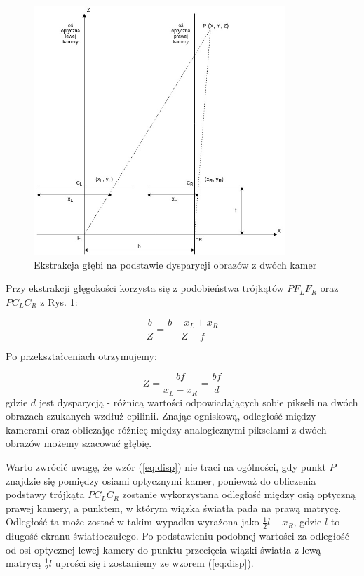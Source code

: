 \documentclass[oneside, eng]{mgr}
\begin{document}
\begin{figure}
	\centering
	\includegraphics[width=9.5cm]{ekstrakcja.jpg}
	\caption{Ekstrakcja głębi na podstawie dysparycji obrazów z dwóch kamer}
	\label{fig:extraction}
\end{figure}

Przy ekstrakcji głęgokości korzysta się z podobieństwa trójkątów $P F_L F_R$ oraz $P C_L C_R$ z Rys. \ref{fig:extraction}:

\begin{equation}
	\frac{b}{Z} = \frac{b-x_L+x_R}{Z-f}
	\label{eq:disp}
\end{equation}

Po przekształceniach otrzymujemy:

\begin{equation}
	Z = \frac{bf}{x_L-x_R} = \frac{bf}{d}
\end{equation}
gdzie $d$ jest dysparycją - różnicą wartości odpowiadających sobie pikseli na dwóch obrazach szukanych wzdłuż epilinii.
Znając ogniskową, odległość między kamerami oraz obliczając różnicę między analogicznymi pikselami z dwóch obrazów możemy szacować głębię.

Warto zwrócić uwagę, że wzór (\ref{eq:disp}) nie traci na ogólności, gdy punkt $P$ znajdzie się pomiędzy osiami optycznymi kamer, ponieważ do obliczenia podstawy trójkąta $P C_L C_R$ zostanie wykorzystana odległość między osią optyczną prawej kamery, a punktem, w którym wiązka światła pada na prawą matrycę. Odległość ta może zostać w takim wypadku wyrażona jako $\frac{1}{2}l-x_R$, gdzie $l$ to długość ekranu światłoczułego. Po podstawieniu podobnej wartości za odległość od osi optycznej lewej kamery do punktu przecięcia wiązki światła z lewą matrycą $\frac{1}{2}l$ uprości się i zostaniemy ze wzorem (\ref{eq:disp}).
\end{document}
